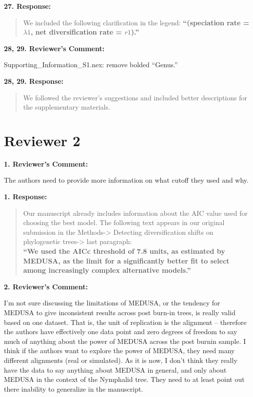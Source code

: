 \documentclass[]{article}
\begin{document}
\textbf{27. Response:}

\begin{quote}
\color{blue}
We included the following clarification in the legend:
\textbf{``(speciation rate = \(\lambda1\), net diversification rate =
\(r1\)).''}
\end{quote}

\textbf{28, 29. Reviewer's Comment:}

Supporting\_Information\_S1.nex: remove bolded ``Genus.''

\textbf{28, 29. Response:}

\begin{quote}
\color{blue}
We followed the reviewer's suggestions and included better descriptions
for the supplementary materials.
\end{quote}

\section{Reviewer 2}\label{reviewer-2}

\textbf{1. Reviewer's Comment:}

The authors need to provide more information on what cutoff they used
and why.

\textbf{1. Response:}

\begin{quote}
\color{blue}
Our manuscript already includes information about the AIC value used for
choosing the best model. The following text appears in our original
submission in the Methods-\textgreater{} Detecting diversification
shifts on phylogenetic trees-\textgreater{} last
paragraph:\\\textbf{``We used the AICc threshold of 7.8 units, as
estimated by MEDUSA, as the limit for a significantly better fit to
select among increasingly complex alternative models.''}
\end{quote}

\textbf{2. Reviewer's Comment:}

I'm not sure discussing the limitations of MEDUSA, or the tendency for
MEDUSA to give inconsistent results across post burn-in trees, is really
valid based on one dataset. That is, the unit of replication is the
alignment -- therefore the authors have effectively one data point and
zero degrees of freedom to say much of anything about the power of
MEDUSA across the post burnin sample. I think if the authors want to
explore the power of MEDUSA, they need many different alignments (real
or simulated). As it is now, I don't think they really have the data to
say anything about MEDUSA in general, and only about MEDUSA in the
context of the Nymphalid tree. They need to at least point out there
inability to generalize in the manuscript.
\end{document}
